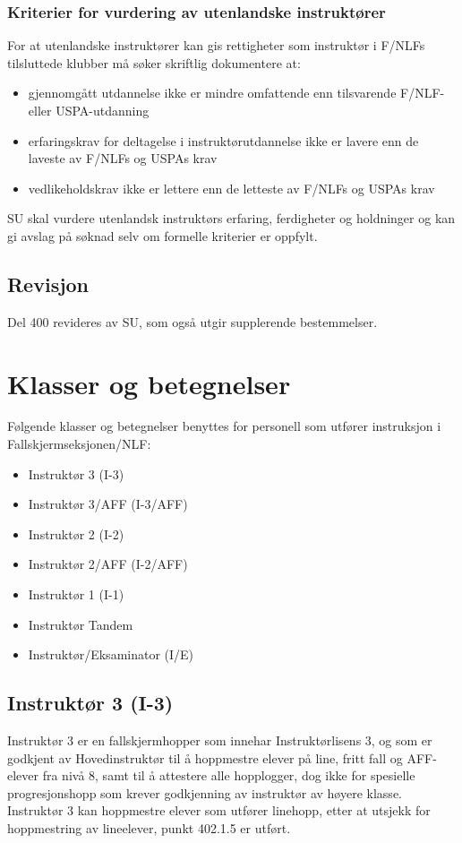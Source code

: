 \subsubsection{Kriterier for vurdering av utenlandske instruktører}
For at utenlandske instruktører kan gis rettigheter som instruktør i F/NLFs tilsluttede klubber må søker skriftlig dokumentere at:
\begin{itemize}
	\item gjennomgått utdannelse ikke er mindre omfattende enn tilsvarende F/NLF- eller USPA-utdanning
	\item erfaringskrav for deltagelse i instruktørutdannelse ikke er lavere enn de laveste av F/NLFs og USPAs krav
	\item vedlikeholdskrav ikke er lettere enn de letteste av F/NLFs og USPAs krav
\end{itemize}

SU skal vurdere utenlandsk instruktørs erfaring, ferdigheter og holdninger og kan gi avslag på søknad selv om formelle kriterier er oppfylt.

\subsection{Revisjon}
Del 400 revideres av SU, som også utgir supplerende bestemmelser.

\section{Klasser og betegnelser}
Følgende klasser og betegnelser benyttes for personell som utfører instruksjon i Fallskjermseksjonen/NLF:
\begin{itemize}
	\item Instruktør 3 (I-3)
	\item Instruktør 3/AFF (I-3/AFF)
	\item Instruktør 2 (I-2)
	\item Instruktør 2/AFF (I-2/AFF)
	\item Instruktør 1 (I-1)
	\item Instruktør Tandem
	\item Instruktør/Eksaminator (I/E)
\end{itemize}

\subsection{Instruktør 3 (I-3)}
Instruktør 3 er en fallskjermhopper som innehar Instruktørlisens 3, og som er godkjent av Hovedinstruktør til å hoppmestre elever på line, fritt fall og AFF-elever fra nivå 8, samt til å attestere alle hopplogger, dog ikke for spesielle progresjonshopp som krever godkjenning av instruktør av høyere klasse. Instruktør 3 kan hoppmestre elever som utfører linehopp, etter at utsjekk for hoppmestring av lineelever, punkt 402.1.5 er utført.

